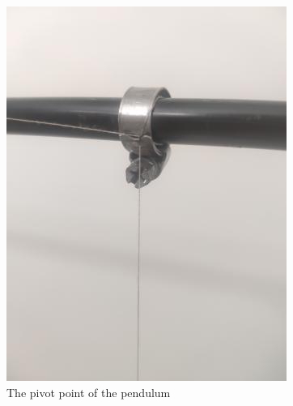 \documentclass[12pt]{article}
\begin{document}
\begin{figure}[!htb]
\includegraphics[width=\linewidth]{img-knot.jpg}
\caption{The pivot point of the pendulum}\label{fig:knot}
\endminipage\hfill
{}

\end{figure}
\end{document}
